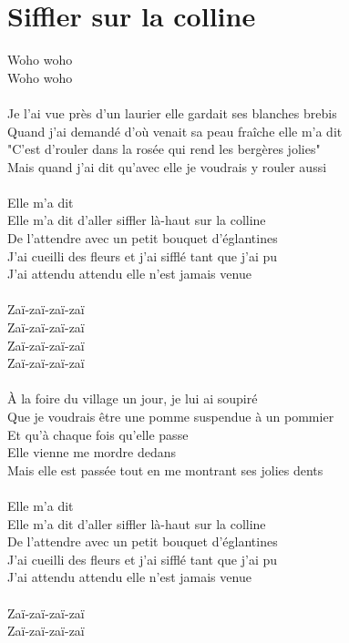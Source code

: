 \section*{Siffler sur la colline}
Woho woho\\
Woho woho\\\\
Je l'ai vue près d'un laurier elle gardait ses blanches brebis\\
Quand j'ai demandé d'où venait sa peau fraîche elle m'a dit\\
"C'est d'rouler dans la rosée qui rend les bergères jolies"\\
Mais quand j'ai dit qu'avec elle je voudrais y rouler aussi\\\\
Elle m'a dit\\
Elle m'a dit d'aller siffler là-haut sur la colline\\
De l'attendre avec un petit bouquet d'églantines\\
J'ai cueilli des fleurs et j'ai sifflé tant que j'ai pu\\
J'ai attendu attendu elle n'est jamais venue\\\\
Zaï-zaï-zaï-zaï\\
Zaï-zaï-zaï-zaï\\
Zaï-zaï-zaï-zaï\\
Zaï-zaï-zaï-zaï\\\\
À la foire du village un jour, je lui ai soupiré\\
Que je voudrais être une pomme suspendue à un pommier\\
Et qu'à chaque fois qu'elle passe\\
Elle vienne me mordre dedans\\
Mais elle est passée tout en me montrant ses jolies dents\\\\
Elle m'a dit\\
Elle m'a dit d'aller siffler là-haut sur la colline\\
De l'attendre avec un petit bouquet d'églantines\\
J'ai cueilli des fleurs et j'ai sifflé tant que j'ai pu\\
J'ai attendu attendu elle n'est jamais venue\\\\
Zaï-zaï-zaï-zaï\\
Zaï-zaï-zaï-zaï\\
